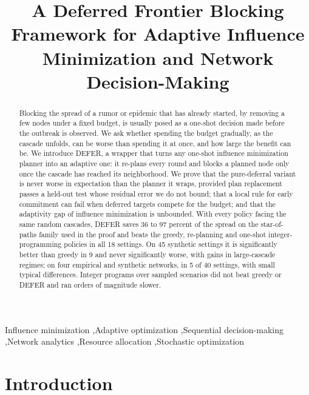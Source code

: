 \documentclass[preprint,11pt]{elsarticle}
\theoremstyle{definition}
\theoremstyle{remark}
\begin{document}
\begin{frontmatter}
\title{A Deferred Frontier Blocking Framework for Adaptive Influence Minimization and Network Decision-Making}
\begin{abstract}
Blocking the spread of a rumor or epidemic that has already started, by removing a few nodes under a fixed budget, is usually posed as a one-shot decision made before the outbreak is observed. We ask whether spending the budget gradually, as the cascade unfolds, can be worse than spending it at once, and how large the benefit can be. We introduce DEFER, a wrapper that turns any one-shot influence minimization planner into an adaptive one: it re-plans every round and blocks a planned node only once the cascade has reached its neighborhood. We prove that the pure-deferral variant is never worse in expectation than the planner it wraps, provided plan replacement passes a held-out test whose residual error we do not bound; that a local rule for early commitment can fail when deferred targets compete for the budget; and that the adaptivity gap of influence minimization is unbounded. With every policy facing the same random cascades, DEFER saves 36 to 97 percent of the spread on the star-of-paths family used in the proof and beats the greedy, re-planning and one-shot integer-programming policies in all 18 settings. On 45 synthetic settings it is significantly better than greedy in 9 and never significantly worse, with gains in large-cascade regimes; on four empirical and synthetic networks, in 5 of 40 settings, with small typical differences. Integer programs over sampled scenarios did not beat greedy or DEFER and ran orders of magnitude slower.
\end{abstract}

\begin{keyword}
Influence minimization \sep Adaptive optimization \sep Sequential decision-making \sep Network analytics \sep Resource allocation \sep Stochastic optimization
\end{keyword}
\end{frontmatter}

\section{Introduction}\label{sec:intro}
\end{document}
